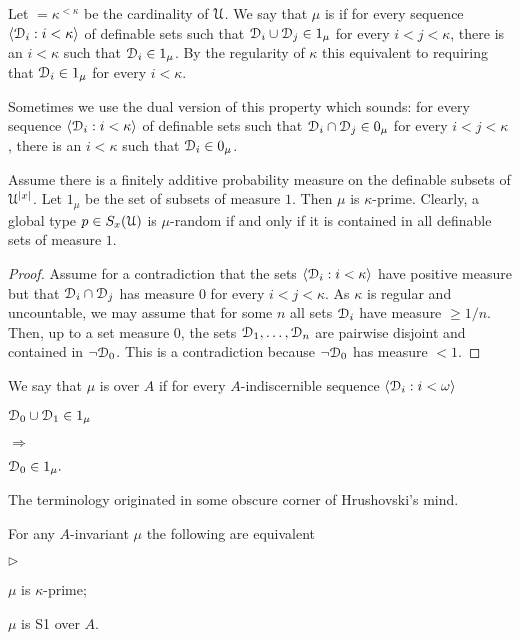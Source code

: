 \documentclass{amsproc}
\newcommand{\mylabel}[1]{{#1}\hfill}
\renewenvironment{itemize}
  {\begin{list}{$\triangleright$}{%
  \setlength{\parskip}{0mm}
  \setlength{\topsep}{.4\baselineskip}
  \setlength{\rightmargin}{0mm}
  \setlength{\listparindent}{0mm}
  \setlength{\itemindent}{0mm}
  \setlength{\labelwidth}{3ex}
  \setlength{\itemsep}{.2\baselineskip}
  \setlength{\parsep}{.2\baselineskip}
  \setlength{\partopsep}{0mm}
  \setlength{\labelsep}{1ex}
  \setlength{\leftmargin}{\labelwidth+\labelsep}
  \let\makelabel\mylabel}}{%
\end{list}}
\renewcommand*{\emph}[1]{%
   \smash{\tikz[baseline]\node[rectangle, fill=teal!25, rounded corners, inner xsep=0.5ex, inner ysep=0.2ex, anchor=base, minimum height = 2.7ex]{\strut #1};}}
\begin{document}
Let \emph{$\kappa$}$=\kappa^{<\kappa}$ be the cardinality of $\EuScript U$.
We say that $\mu$ is \emph{$\kappa$-prime} if for every sequence $\langle\EuScript D_i:i<\kappa\rangle$ of definable sets such that $\EuScript D_i\cup \EuScript D_j\in1_\mu$ for every $i<j<\kappa$, there is an $i<\kappa$ such that $\EuScript D_i\in1_\mu$.
By the regularity of $\kappa$ this equivalent to requiring that  $\EuScript D_i\in1_\mu$ for every $i<\kappa$.

Sometimes we use the dual version of this property which sounds: for every sequence $\langle\EuScript D_i:i<\kappa\rangle$ of definable sets such that $\EuScript D_i\cap \EuScript D_j\in0_\mu$ for every $i<j<\kappa$, there is an $i<\kappa$ such that $\EuScript D_i\in0_\mu$.

\begin{example}
  Assume there is a finitely additive probability measure on the definable subsets of $\EuScript U^{|x|}$.
  Let $1_\mu$ be the set of subsets of measure $1$.
  Then $\mu$ is $\kappa$-prime.
  Clearly, a global type $p\in S_x(\EuScript U)$ is $\mu$-random if and only if it is contained in all definable sets of measure $1$.
\end{example}

\begin{proof}
  Assume for a contradiction that the sets $\langle\EuScript D_i:i<\kappa\rangle$ have positive measure but that $\EuScript D_i\cap \EuScript D_j$ has measure $0$ for every $i<j<\kappa$.
  As $\kappa$ is regular and uncountable, we may assume that for some $n$ all sets $\EuScript D_i$ have measure $\ge 1/n$.
  Then, up to a set measure $0$, the sets $\EuScript D_1,\dots,\EuScript D_n$ are pairwise disjoint and contained in $\neg\EuScript D_0$.
  This is a contradiction because $\neg\EuScript D_0$ has measure $<1$.
\end{proof}

We say that $\mu$ is \emph{S1\/} over $A$ if for every $A$-indiscernible sequence $\langle\EuScript D_i:i<\omega\rangle$
    
\def\ceq#1#2#3{\parbox[t]{25ex}{$\displaystyle #1$}\parbox{6ex}{\hfil $#2$}{$\displaystyle #3$}}

\ceq{\hfill\EuScript D_0\cup\EuScript D_1\in1_\mu}{\Rightarrow}{\EuScript D_0\in1_\mu.}

The terminology originated in some obscure corner of Hrushovski's mind.

\begin{fact}
  For any $A$-invariant $\mu$ the following are equivalent
  \begin{itemize}
    \item[1.] $\mu$ is $\kappa$-prime;
    \item[2.] $\mu$ is S1 over $A$.
  \end{itemize}
\end{fact}
\end{document}
